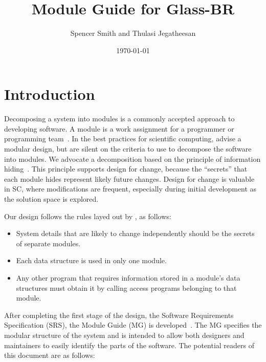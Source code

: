\documentclass[12pt]{article}
\begin{document}
\title{Module Guide for Glass-BR} 
\author{Spencer Smith and Thulasi Jegatheesan}
\date{\today}
	
\maketitle

\tableofcontents

\newpage

\section{Introduction}

Decomposing a system into modules is a commonly accepted approach to developing
software.  A module is a work assignment for a programmer or programming
team~\citep{ParnasEtAl1984}.  In the best practices for scientific computing,
\citet{WilsonEtAl2013} advise a modular design, but are silent on the criteria
to use to decompose the software into modules.  We advocate a decomposition
based on the principle of information hiding~\citep{Parnas1972a}.  This
principle supports design for change, because the ``secrets'' that each module
hides represent likely future changes.  Design for change is valuable in SC,
where modifications are frequent, especially during initial development as the
solution space is explored.  

Our design follows the rules layed out by \citet{ParnasEtAl1984}, as follows:
\begin{itemize}
\item System details that are likely to change independently should be the
  secrets of separate modules.
\item Each data structure is used in only one module.
\item Any other program that requires information stored in a module's data
  structures must obtain it by calling access programs belonging to that module.
\end{itemize}

After completing the first stage of the design, the Software Requirements
Specification (SRS), the Module Guide (MG) is developed~\citep{ParnasEtAl1984}. 
The MG
specifies the modular structure of the system and is intended to allow both
designers and maintainers to easily identify the parts of the software.  The
potential readers of this document are as follows:
\end{document}
